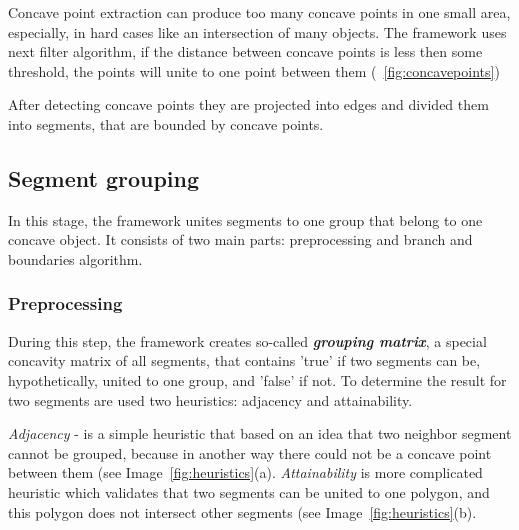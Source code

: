 \documentclass{lutmscthesis}[2010/09/22]
\begin{document}
Concave point extraction can produce too many concave points in one small area, especially, in hard cases like an intersection of many objects. The framework uses next filter algorithm, if the distance between concave points is less then some threshold, the points will unite to one point between them (~\ref{fig:concavepoints})

\begin{figure}[htp]
\end{figure}
After detecting concave points they are projected into edges and divided them into segments, that are bounded by concave points.

\subsection{Segment grouping}

In this stage, the framework unites segments to one group that belong to one concave object. It consists of two main parts: preprocessing and branch and boundaries algorithm.

\subsubsection{Preprocessing} 
During this step, the framework creates so-called \textbf{\textit{grouping matrix}}, a special concavity matrix of all segments, that contains 'true' if two segments can be, hypothetically, united to one group, and 'false' if not. To determine the result for two segments are used two heuristics: adjacency and attainability.

\textit{Adjacency} - is a simple heuristic that based on an idea that two neighbor segment cannot be grouped, because in another way there could not be a concave point between them  (see Image~\ref{fig:heuristics}(a). 
\textit{Attainability} is more complicated heuristic which validates that two segments can be united to one polygon, and this polygon does not intersect other segments (see Image~\ref{fig:heuristics}(b).
\end{document}
